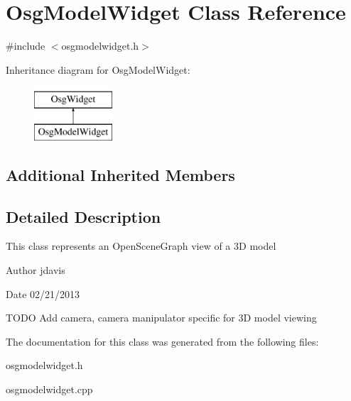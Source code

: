 \hypertarget{classOsgModelWidget}{\section{Osg\-Model\-Widget Class Reference}
\label{classOsgModelWidget}
}


{\ttfamily \#include $<$osgmodelwidget.\-h$>$}

Inheritance diagram for Osg\-Model\-Widget\-:\begin{figure}[H]
\begin{center}
\leavevmode
\includegraphics[height=2.000000cm]{classOsgModelWidget}
\end{center}
\end{figure}
\subsection*{Additional Inherited Members}


\subsection{Detailed Description}
This class represents an Open\-Scene\-Graph view of a 3\-D model

\begin{DoxyAuthor}{Author}
jdavis 
\end{DoxyAuthor}
\begin{DoxyDate}{Date}
02/21/2013
\end{DoxyDate}
T\-O\-D\-O Add camera, camera manipulator specific for 3\-D model viewing 

The documentation for this class was generated from the following files\-:\begin{DoxyCompactItemize}
\item 
osgmodelwidget.\-h\item 
osgmodelwidget.\-cpp\end{DoxyCompactItemize}
